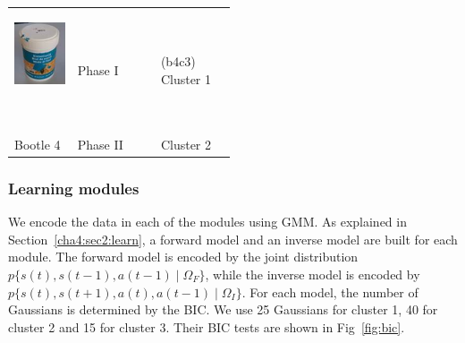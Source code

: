 \begin{table}
\begin{tabular}{p{1.6cm} p{1.6cm}|p{2cm} p{2cm} p{2cm}  p{2cm} }
{\parbox[c]{1em}{\includegraphics[width=1.5cm]{./fig_cha4/b4.jpg}}\newline }
         & Phase I  &           &           &{\vspace{-0.7cm}}\pbox{2cm}{(b4c3) \\Cluster 1} &           \\
Bootle 4 & Phase II &           &           &       Cluster 2 &           \\ \hline
\end{tabular}
\label{tab:cluster}
\end{table}



\subsubsection{Learning modules}
\label{cha4:sec3:learning:module}
We encode the data in each of the modules using GMM. As explained in Section~\ref{cha4:sec2:learn}, a forward model and an inverse model are built for each module. The forward model is encoded by the joint distribution $p\{s(t),s(t-1),a(t-1)\mid\Omega_F\}$, while the inverse model is encoded by $p\{s(t),s(t+1),a(t),a(t-1)\mid\Omega_I\}$. For each model, the number of Gaussians is determined by the BIC. We use 25 Gaussians for cluster 1, 40 for cluster 2 and 15 for cluster 3. Their BIC tests are shown in Fig~\ref{fig:bic}.

